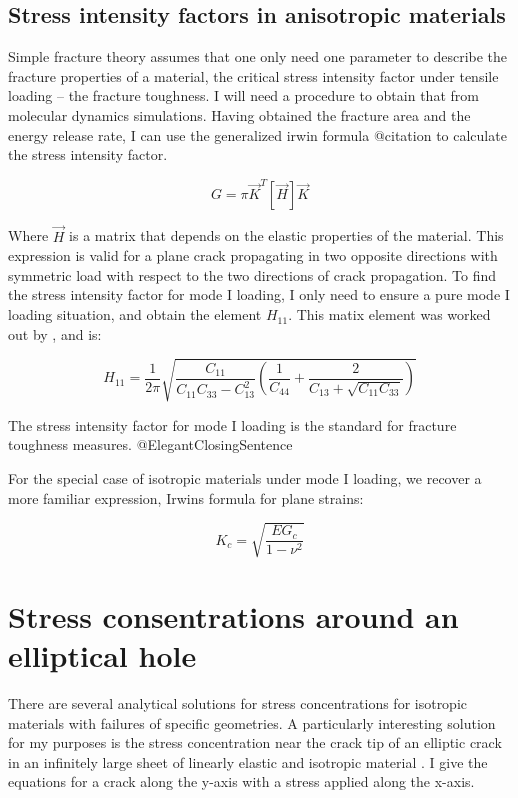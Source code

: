 \subsection{Stress intensity factors in anisotropic materials}
Simple fracture theory assumes that one only need one parameter to describe the fracture properties of a material, the critical stress intensity factor under tensile loading -- the fracture toughness. I will need a procedure to obtain that from molecular dynamics simulations. Having obtained the fracture area and the energy release rate, I can use the generalized irwin formula @citation to calculate the stress intensity factor. 

\begin{equation}
	G = \pi \vec{K}^T [\vec{H}] \vec{K} 
\end{equation}

Where $\vec{H}$ is a matrix that depends on the elastic properties of the material. This expression is valid for a plane crack propagating in two opposite directions with symmetric load with respect to the two directions of crack propagation.
To find the stress intensity factor for mode I loading, I only need to ensure a pure mode I loading situation, and obtain the element $H_{11}$. This matix element was worked out by \cite{Laubie2014}, and is:

\begin{equation}
	H_{11} = \frac{1}{2\pi} \sqrt{\frac{C_{11}}{C_{11}C_{33}-C^2_{13}}\left( \frac{1}{C_{44}} + \frac{2}{C_{13} + \sqrt{C_{11} C_{33}}}\right)}
\end{equation}

The stress intensity factor for mode I loading is the standard for fracture toughness measures. @ElegantClosingSentence

For the special case of isotropic materials under mode I loading, we recover a more familiar expression, Irwins formula for plane strains:

\begin{equation}
	K_c = \sqrt{\frac{EG_c}{1-\nu^2}}
\end{equation}

\section{Stress consentrations around an elliptical hole}
There are several analytical solutions for stress concentrations for isotropic materials with failures of specific geometries. A particularly interesting solution for my purposes is the stress concentration near the crack tip of an elliptic crack in an infinitely large sheet of linearly elastic and isotropic material \cite{Anderson2005}. I give the equations for a crack along the y-axis with a stress applied along the x-axis.

